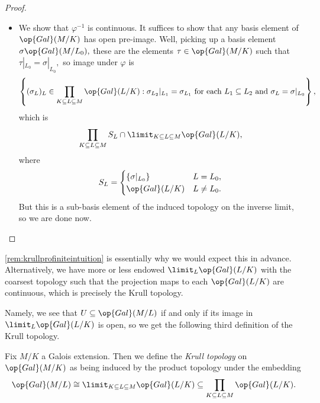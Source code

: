 \documentclass[../notes.tex]{subfiles}
\begin{document}
\begin{proof}
\begin{itemize}
		\item We show that $\varphi^{-1}$ is continuous. It suffices to show that any basis element of $\op{Gal}(M/K)$ has open pre-image. Well, picking up a basis element $\sigma\op{Gal}(M/L_0),$ these are the elements $\tau\in\op{Gal}(M/K)$ such that $\tau|_{L_0}=\sigma|_{L_0},$ so image under $\varphi$ is
		\[\left\{(\sigma_L)_L\in\prod_{K\subseteq L\subseteq M}\op{Gal}(L/K):\sigma_{L_2}|_{L_1}=\sigma_{L_1}\text{ for each }L_1\subseteq L_2\text{ and }\sigma_L=\sigma|_{L_0}\right\},\]
		which is
		\[\prod_{K\subseteq L\subseteq M}S_L\cap\limit_{K\subseteq L\subseteq M}\op{Gal}(L/K),\]
		where
		\[S_L=\begin{cases}
			\{\sigma|_{L_0}\} & L=L_0, \\
			\op{Gal}(L/K) & L\ne L_0.
		\end{cases}\]
		But this is a sub-basis element of the induced topology on the inverse limit, so we are done now.
		\qedhere
	\end{itemize}
\end{proof}
\begin{remark}
	\autoref{rem:krullprofiniteintuition} is essentially why we would expect this in advance. Alternatively, we have more or less endowed $\limit_{L}\op{Gal}(L/K)$ with the coarsest topology such that the projection maps to each $\op{Gal}(L/K)$ are continuous, which is precisely the Krull topology.
\end{remark}
Namely, we see that $U\subseteq\op{Gal}(M/L)$ if and only if its image in $\limit_L\op{Gal}(L/K)$ is open, so we get the following third definition of the Krull topology.
\begin{definition}
	Fix $M/K$ a Galois extension. Then we define the \textit{Krull topology} on $\op{Gal}(M/K)$ as being induced by the product topology under the embedding
	\[\op{Gal}(M/L)\cong\limit_{K\subseteq L\subseteq M}\op{Gal}(L/K)\subseteq\prod_{K\subseteq L\subseteq M}\op{Gal}(L/K).\]
\end{definition}
\end{document}
